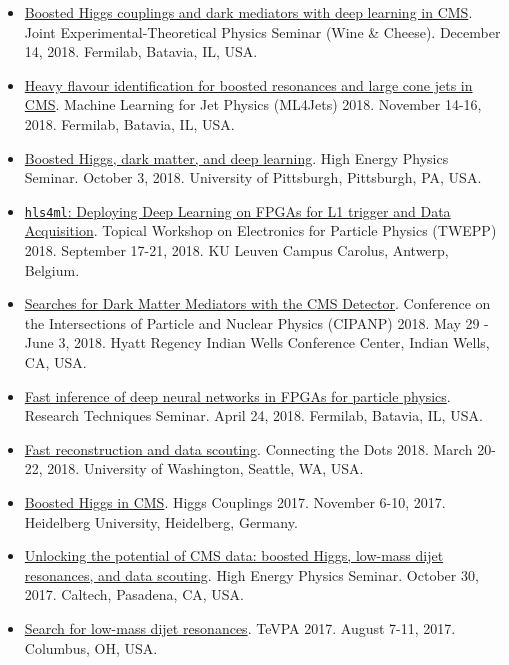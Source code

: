 \documentclass[11pt]{res}
\begin{document}
\begin{resume}
\begin{itemize}
    \item \href{http://theory.fnal.gov/events/event/results-from-cms-18/}{Boosted Higgs couplings and dark mediators with deep learning in CMS}. Joint Experimental-Theoretical Physics Seminar (Wine \& Cheese). December 14, 2018. Fermilab, Batavia, IL, USA.
    \item \href{https://indico.cern.ch/event/745718/contributions/3211982/}{Heavy flavour identification for boosted resonances and large cone jets in CMS}. Machine Learning for Jet Physics (ML4Jets) 2018. November 14-16, 2018. Fermilab, Batavia, IL, USA.
    \item \href{https://www.physicsandastronomy.pitt.edu/events/hep-seminar-javier-duarte-fermilab}{Boosted Higgs, dark matter, and deep learning}. High Energy Physics Seminar. October 3, 2018. University of Pittsburgh, Pittsburgh, PA, USA.
    \item \href{https://indico.cern.ch/event/697988/contributions/3055990/}{\texttt{hls4ml}: Deploying Deep Learning on FPGAs for L1 trigger and Data Acquisition}. Topical Workshop on Electronics for Particle Physics (TWEPP) 2018. September 17-21, 2018. KU Leuven Campus Carolus, Antwerp, Belgium.
    \item \href{https://conferences.lbl.gov/event/137/session/27/contribution/354}{Searches for Dark Matter Mediators with the CMS Detector}. Conference on the Intersections of Particle and Nuclear Physics (CIPANP) 2018. May 29 - June 3, 2018. Hyatt Regency Indian Wells Conference Center, Indian Wells, CA, USA.
    \item \href{https://indico.fnal.gov/event/16908/}{Fast inference of deep neural networks in FPGAs for particle physics}. Research Techniques Seminar. April 24, 2018. Fermilab, Batavia, IL, USA.
    \item \href{https://indico.cern.ch/event/658267/contributions/2881127/}{Fast reconstruction and data scouting}. Connecting the Dots 2018. March 20-22, 2018. University of Washington, Seattle, WA, USA.
    \item \href{http://www.thphys.uni-heidelberg.de/~higgs/talks/duarte.pdf}{Boosted Higgs in CMS}. Higgs Couplings 2017. November 6-10, 2017. Heidelberg University, Heidelberg, Germany.
    \item \href{https://indico.hep.caltech.edu/indico/conferenceDisplay.py?confId=149}{Unlocking the potential of CMS data: boosted Higgs, low-mass dijet resonances, and data scouting}. High Energy Physics Seminar. October 30, 2017. Caltech, Pasadena, CA, USA.
    \item \href{https://indico.cern.ch/event/615891/contributions/2666361/}{Search for low-mass dijet resonances}. TeVPA 2017. August 7-11, 2017. Columbus, OH, USA.

\end{itemize}
\end{resume}
\end{document}
